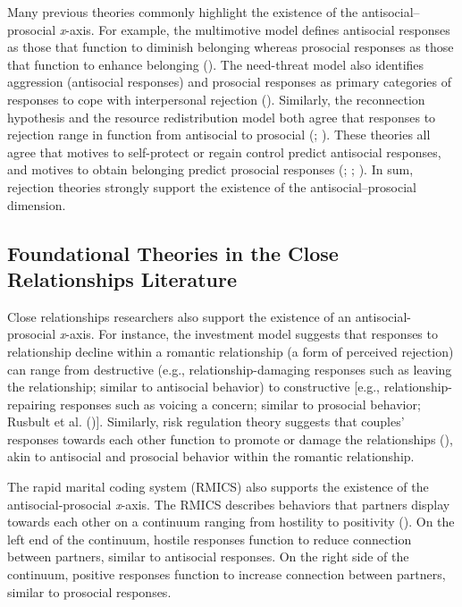 \documentclass[
]{udthesis}
\begin{document}
Many previous theories commonly highlight the existence of the
antisocial--prosocial \emph{x}-axis. For example, the multimotive model
defines antisocial responses as those that function to diminish
belonging whereas prosocial responses as those that function to enhance
belonging (). The need-threat model also identifies
aggression (antisocial responses) and prosocial responses as primary
categories of responses to cope with interpersonal rejection
(). Similarly, the reconnection hypothesis and the resource
redistribution model both agree that responses to rejection range in
function from antisocial to prosocial (; ).
These theories all agree that motives to self-protect or regain control
predict antisocial responses, and motives to obtain belonging predict
prosocial responses (; ; ). In sum,
rejection theories strongly support the existence of the
antisocial--prosocial dimension.

\subsection{Foundational Theories in the Close Relationships Literature}\label{foundational-theories-in-the-close-relationships-literature}

Close relationships researchers also support the existence of an
antisocial-prosocial \emph{x}-axis. For instance, the investment model
suggests that responses to relationship decline within a romantic
relationship (a form of perceived rejection) can range from destructive
(e.g., relationship-damaging responses such as leaving the relationship;
similar to antisocial behavior) to constructive {[}e.g.,
relationship-repairing responses such as voicing a concern; similar to
prosocial behavior; Rusbult et al. (){]}. Similarly, risk regulation theory
suggests that couples' responses towards each other function to promote
or damage the relationships (), akin to antisocial and
prosocial behavior within the romantic relationship.

The rapid marital coding system (RMICS) also supports the existence of
the antisocial-prosocial \emph{x}-axis. The RMICS describes behaviors that
partners display towards each other on a continuum ranging from
hostility to positivity (). On the left end of the continuum,
hostile responses function to reduce connection between partners,
similar to antisocial responses. On the right side of the continuum,
positive responses function to increase connection between partners,
similar to prosocial responses.
\end{document}
